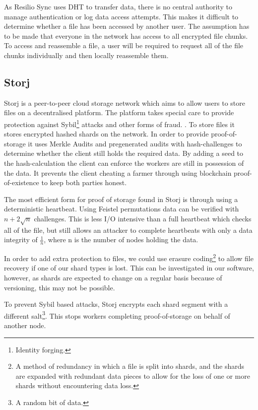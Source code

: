 \documentclass[11pt, a4paper, twoside]{report}
\begin{document}
As Resilio Sync uses DHT to transfer data, there is no central authority to manage authentication or log data access attempts. This makes it difficult to determine whether a file has been accessed by another user. \citep{farina2014bittorrent} The assumption has to be made that everyone in the network has access to all encrypted file chunks. To access and reassemble a file, a user will be required to request all of the file chunks individually and then locally reassemble them.

\subsection{Storj}

Storj is a peer-to-peer cloud storage network which aims to allow users to store files on a decentralised platform. The platform takes special care to provide protection against Sybil\footnote{Identity forging.} attacks and other forms of fraud. \citep{Wilkinson14storja}. To store files it stores encrypted hashed shards on the network. In order to provide proof-of-storage it uses Merkle Audits and pregenerated audits with hash-challenges to determine whether the client still holds the required data. By adding a seed to the hash-calculation the client can enforce the workers are still in possession of the data. It prevents the client cheating a farmer through using blockchain proof-of-existence to keep both parties honest.

The most efficient form for proof of storage found in Storj is through using a deterministic heartbeat. Using Feistel permutations data can be verified with $n + 2 \sqrt{n}$ challenges. This is less I/O intensive than a full heartbeat which checks all of the file, but still allows an attacker to complete heartbeats with only a data integrity of $\frac{1}{n}$, where n is the number of nodes holding the data.

In order to add extra protection to files, we could use erasure coding\footnote{A method of redundancy in which a file is split into shards, and the shards are expanded with redundant data pieces to allow for the loss of one or more shards without encountering data loss.} to allow file recovery if one of our shard types is lost. This can be investigated in our software, however, as shards are expected to change on a regular basis because of versioning, this may not be possible.

To prevent Sybil based attacks, Storj encrypts each shard segment with a different salt\footnote{A random bit of data.}. This stops workers completing proof-of-storage on behalf of another node.
\end{document}
